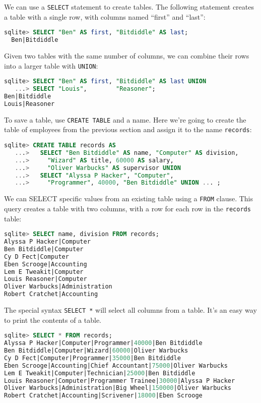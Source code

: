 We can use a \texttt{SELECT} statement to create tables. The following statement
creates a table with a single row, with columns named ``first'' and ``last'':

\begin{lstlisting}[language=SQL]
  sqlite> SELECT "Ben" AS first, "Bitdiddle" AS last;
  Ben|Bitdiddle
\end{lstlisting}

Given two tables with the same number of columns, we can combine their rows
into a larger table with \texttt{UNION}:

\begin{lstlisting}[language=SQL]
sqlite> SELECT "Ben" AS first, "Bitdiddle" AS last UNION
   ...> SELECT "Louis",        "Reasoner";
Ben|Bitdiddle
Louis|Reasoner
\end{lstlisting}

\begin{blocksection}
To save a table, use \texttt{CREATE TABLE} and a name.
Here we're going to create the table of employees from the
previous section and assign it to the name \texttt{records}:

\begin{lstlisting}[language=SQL]
sqlite> CREATE TABLE records AS
   ...>   SELECT "Ben Bitdiddle" AS name, "Computer" AS division,
   ...>     "Wizard" AS title, 60000 AS salary,
   ...>     "Oliver Warbucks" AS supervisor UNION
   ...>   SELECT "Alyssa P Hacker", "Computer",
   ...>     "Programmer", 40000, "Ben Bitdiddle" UNION ... ;
\end{lstlisting}
\end{blocksection}

We can SELECT specific values from an existing table using a \texttt{FROM} 
clause. This query creates a table with two columns, with a row for each row in the
\texttt{records} table:

\begin{lstlisting}[language=SQL]
sqlite> SELECT name, division FROM records;
Alyssa P Hacker|Computer
Ben Bitdiddle|Computer
Cy D Fect|Computer
Eben Scrooge|Accounting
Lem E Tweakit|Computer
Louis Reasoner|Computer
Oliver Warbucks|Administration
Robert Cratchet|Accounting
\end{lstlisting}

The special syntax \texttt{SELECT *} will select all columns from a table. It's
an easy way to print the contents of a table.

\begin{lstlisting}[language=SQL]
sqlite> SELECT * FROM records;
Alyssa P Hacker|Computer|Programmer|40000|Ben Bitdiddle
Ben Bitdiddle|Computer|Wizard|60000|Oliver Warbucks
Cy D Fect|Computer|Programmer|35000|Ben Bitdiddle
Eben Scrooge|Accounting|Chief Accountant|75000|Oliver Warbucks
Lem E Tweakit|Computer|Technician|25000|Ben Bitdiddle
Louis Reasoner|Computer|Programmer Trainee|30000|Alyssa P Hacker
Oliver Warbucks|Administration|Big Wheel|150000|Oliver Warbucks
Robert Cratchet|Accounting|Scrivener|18000|Eben Scrooge
\end{lstlisting}

